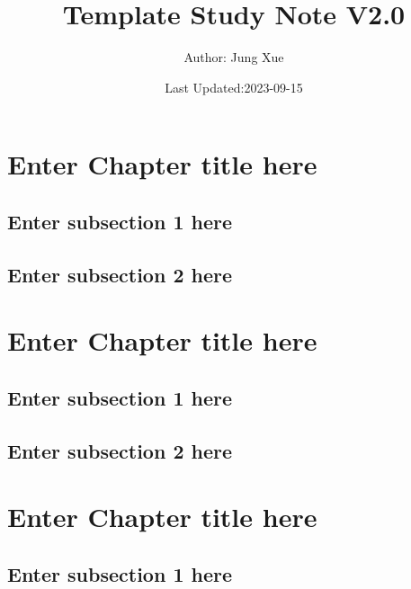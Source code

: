 \documentclass[
]{book}
\title{Template Study Note V2.0}
\author{Author: Jung Xue}
\date{Last Updated:2023-09-15}
\begin{document}
\maketitle

{
\setcounter{tocdepth}{1}
\tableofcontents
}
\hypertarget{ch1}{%
\chapter{Enter Chapter title here}\label{ch1}}

\hypertarget{enter-subsection-1-here}{%
\section{Enter subsection 1 here}\label{enter-subsection-1-here}}

\hypertarget{enter-subsection-2-here}{%
\section{Enter subsection 2 here}\label{enter-subsection-2-here}}

\hypertarget{ch2}{%
\chapter{Enter Chapter title here}\label{ch2}}

\hypertarget{enter-subsection-1-here-1}{%
\section{Enter subsection 1 here}\label{enter-subsection-1-here-1}}

\hypertarget{enter-subsection-2-here-1}{%
\section{Enter subsection 2 here}\label{enter-subsection-2-here-1}}

\hypertarget{ch3}{%
\chapter{Enter Chapter title here}\label{ch3}}

\hypertarget{enter-subsection-1-here-2}{%
\section{Enter subsection 1 here}\label{enter-subsection-1-here-2}}
\end{document}

